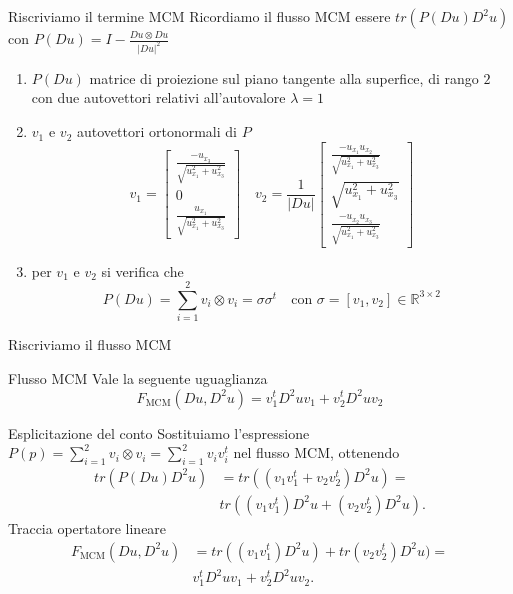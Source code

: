 \begin{frame}{Riscriviamo il termine MCM}
  Ricordiamo il flusso MCM essere $tr(P(Du)D^2u)$ con
  $P(Du)=I-\frac{Du\otimes Du}{|Du|^2}$
  \begin{enumerate}
    \item $P(Du)$ matrice di proiezione sul piano tangente alla
      superfice, di rango $2$ con due autovettori relativi
      all'autovalore $\lambda=1$ 
    \item  $v_1$ e $v_2$ autovettori ortonormali di $P$ 
      \[
      v_1=
      \begin{bmatrix}
        \frac{-u_{x_3}}{\sqrt{u_{x_1}^2+u_{x_3}^2}} \\
        0 \\
        \frac{u_{x_1}}{\sqrt{u_{x_1}^2+u_{x_3}^2}}
      \end{bmatrix}
      \quad
      v_2=\frac{1}{|Du|}
      \begin{bmatrix}
        \frac{-u_{x_1}u_{x_2}}{\sqrt{u_{x_1}^2+u_{x_3}^2}} \\
        \sqrt{u_{x_1}^2+u_{x_3}^2} \\
        \frac{-u_{x_2}u_{x_3}}{\sqrt{u_{x_1}^2+u_{x_3}^2}}
      \end{bmatrix}
      \]
    \item per $v_1$ e $v_2$ si verifica che 
    \[
    P(Du)=\sum_{i=1}^2v_i\otimes v_i=\sigma\sigma^t\quad\text{con }
    \sigma=[v_1,v_2]\in\mathbb{R}^{3\times 2} 
    \]
  \end{enumerate}
\end{frame}

\begin{frame}{Riscriviamo il flusso MCM}
  \begin{alertblock}{Flusso MCM}
    Vale la seguente uguaglianza
    \[
    F_{\text{MCM}}(Du,D^2u)=v_1^tD^2uv_1+v_2^tD^2uv_2
    \]
  \end{alertblock}
  \begin{block}{Esplicitazione del conto}
  Sostituiamo l'espressione  $P(p)=\sum_{i=1}^2v_i\otimes
  v_i=\sum_{i=1}^2v_iv_i^t$ nel flusso MCM, ottenendo
  \[
  \begin{aligned}
    tr(P(Du)D^2u)&=tr((v_1v_1^t+v_2v_2^t)D^2u)=\\
    &tr((v_1v_1^t)D^2u+(v_2v_2^t)D^2u).
  \end{aligned}
  \]
  Traccia opertatore lineare
  \[
  \begin{aligned}
    F_{\text{MCM}}(Du,D^2u)&=tr((v_1v_1^t)D^2u)+tr(v_2v_2^t)D^2u)=\\
    &v_1^tD^2uv_1+v_2^tD^2uv_2.
  \end{aligned}
    \]
  \end{block}
\end{frame}

